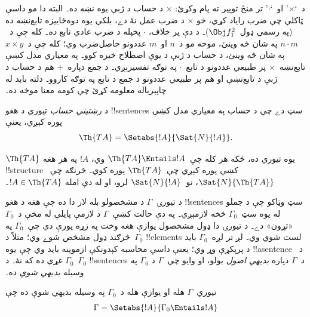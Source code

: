 \documentclass[../../../include/open-logic-section]{subfiles}
\begin{document}
د~`$\times$' او~`$\cdot$' تر منځ توپير ته پام وکړئ: $\times$ د حساب
د ژبې يوه نښه ده۔ البته دا مو داسې ټاکلې چې ضرب راياد کړي، خو
$\times$ د ضرب عمل نۀ دے، بلکې يوه دوه‌ځاييزه تابع‌نښه ده (په رسمي
ډول~$\Obj f^2_1$)۔ د دې پر خلاف، $\cdot$ پخپله د ضرب عادي تابع
\emph{ده}۔ کله چې د~$n \cdot m$ په شان څه وينئ، موخه مو د~$n$ او~$m$
عددونو حاصل‌ضرب وي؛ کله چې د~$x \times y$ په شان څه وينئ، د حساب د
ژبې د يوې اصطلاح خبره کوو۔ په معياري مدل کښې تابع‌نښه~$\times$ پر
طبيعي عددونو د تابع~$\cdot$ په توګه تفسيرېږي۔ د جمع دپاره~$+$ هم د
حساب د ژبې د تابع‌نښې او هم پر طبيعي عددونو د جمع د تابع په توګه
کاروو۔ دلته بايد له چاپېرياله معلومه کړئ چې کومه معنا موخه ده۔

\begin{defn}
د \emph{رښتيني حساب} تيوري د هغو !!{sentence}s سټ دے چې د حساب په
معياري مدل کښې پوره کېږي، يعنې
\[
\Th{TA} = \Setabs{!A}{\Sat{N}{!A}}.
\]
\end{defn}

$\Th{TA}$ يوه تيوري ده، ځکه هر کله چې~$\Th{TA} \Entails !A$ وي،
$!A$ په هر هغه !!{structure} کښې پوره کېږي چې~$\Th{TA}$ پوره کوي۔
څرنګه چې~$\Sat{N}{\Th{TA}}$، نو~$\Sat{N}{!A}$ لرو، او له دې امله
$!A \in \Th{TA}$۔

د تيورۍ~$\Gamma$ د مشخصولو بله لار دا ده چې هغه د هغو !!{sentence}s سټ وټاکو
چې د جملو له يوه سټ~$\Gamma_0$ څخه لازمېږي۔ په دې حالت کښې~$\Gamma$
د لازمې پايلې له مخې د~$\Gamma_0$ «تړون» دے۔ د تيورۍ دا ډول مشخصول
يوازې هغه وخت په زړه پورې دي چې~$\Gamma_0$ په څرګند ډول مشخص شوے وي؛
مثلاً د~$\Gamma_0$ !!{element}s لست شوي وي۔ لږ تر لږه~$\Gamma_0$
بايد د پرېکړې وړ وي؛ يعنې داسې محاسبه کېدونکې ازموينه بايد وي چې يوه
!!a{sentence} د~$\Gamma_0$ غړې ده که نۀ۔ د~$\Gamma_0$ !!{sentence}s
د~$\Gamma$ دپاره \emph{بديهي اصول} بولو، او وايو چې~$\Gamma$ د
$\Gamma_0$ په وسيله \emph{بديهي شوې} ده۔

\begin{defn}
تيوري~$\Gamma$ هله او يوازې هله د~$\Gamma_0$ په وسيله بديهي شوې ده
چې
\[
\Gamma = \Setabs{!A}{\Gamma_0 \Entails !A}
\]
\end{defn}
\end{document}
